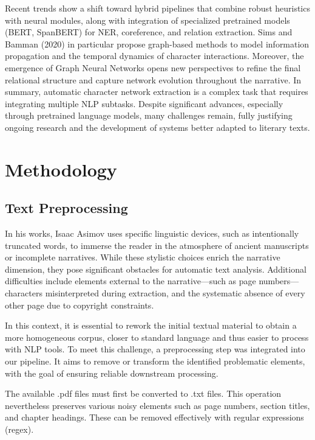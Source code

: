 \documentclass[a4paper]{article}
\begin{document}
Recent trends show a shift toward hybrid pipelines that combine robust heuristics with neural modules, along with integration of specialized pretrained models (BERT, SpanBERT) for NER, coreference, and relation extraction. Sims and Bamman (2020) in particular propose graph-based methods to model information propagation and the temporal dynamics of character interactions. Moreover, the emergence of Graph Neural Networks opens new perspectives to refine the final relational structure and capture network evolution throughout the narrative. In summary, automatic character network extraction is a complex task that requires integrating multiple NLP subtasks. Despite significant advances, especially through pretrained language models, many challenges remain, fully justifying ongoing research and the development of systems better adapted to literary texts.

\section{Methodology}

\subsection{Text Preprocessing}

In his works, Isaac Asimov uses specific linguistic devices, such as intentionally truncated words, to immerse the reader in the atmosphere of ancient manuscripts or incomplete narratives. While these stylistic choices enrich the narrative dimension, they pose significant obstacles for automatic text analysis. Additional difficulties include elements external to the narrative—such as page numbers—characters misinterpreted during extraction, and the systematic absence of every other page due to copyright constraints.

In this context, it is essential to rework the initial textual material to obtain a more homogeneous corpus, closer to standard language and thus easier to process with NLP tools. To meet this challenge, a preprocessing step was integrated into our pipeline. It aims to remove or transform the identified problematic elements, with the goal of ensuring reliable downstream processing.

The available .pdf files must first be converted to .txt files. This operation nevertheless preserves various noisy elements such as page numbers, section titles, and chapter headings. These can be removed effectively with regular expressions (regex).
\end{document}
